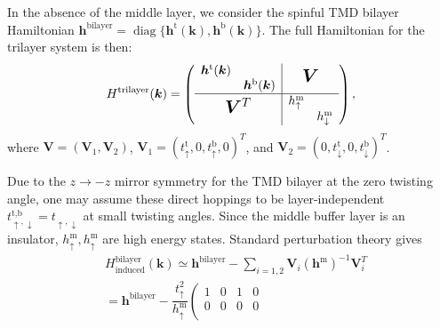\begin{subappendices}
	In the absence of the middle layer, we consider the spinful TMD bilayer Hamiltonian $\bm{h}^\text{bilayer}=\mathop{\mathrm{diag}}\{\bm{h}^\text{t}(\bm{k}), \bm{h}^\text{b}(\bm{k})\}$. The full Hamiltonian for the trilayer system is then:
	\begin{equation}\label{trilayer Hamiltonian}
		H^{\text{trilayer}}(\bm{k})=\left(\begin{array}{c|c}
				\begin{matrix}
					\bm{h}^\text{t}(\bm{k}) &                         \\
					                        & \bm{h}^\text{b}(\bm{k})
				\end{matrix} & \text{\Large $\bm{V}$}                                                  \\
				\hline
				\text{\Large $\bm{V}^T$}                             & \begin{matrix}
					                                                       h^\text{m}_\uparrow &                       \\
					                                                                           & h^\text{m}_\downarrow
				                                                       \end{matrix}
			\end{array}\right),
	\end{equation}
	where $\bm{V}=(\bm{V}_1,\bm{V}_2)$, $\bm{V}_1=(t^\text{t}_\uparrow,0,t^\text{b}_\uparrow,0)^T$, and $\bm{V}_2=(0,t^\text{t}_\downarrow,0,t^\text{b}_\downarrow)^T$.\par
	Due to the $z\rightarrow -z$ mirror symmetry for the TMD bilayer at the zero twisting angle, one may assume these direct hoppings to be layer-independent $t^{\text{t,b}}_{\uparrow,\downarrow}=t_{\uparrow,\downarrow}$ at small twisting angles. Since the middle buffer layer is an insulator, 	$h^\text{m}_\uparrow,	h^\text{m}_\uparrow$ are high energy states. Standard perturbation theory gives
	\begin{align}
		 & H^{\text{bilayer}}_\text{induced}(\bm{k})\simeq \bm{h}^{\text{bilayer}}-\sum_{i=1,2} \bm{V}_i(\bm{h}^\text{m})^{-1}\bm{V}_i^T\nonumber                                    \\
		 & =\bm{h}^{\text{bilayer}}-\dfrac{t_\uparrow^2}{h^\text{m}_\uparrow}\left(\begin{array}{cccc}
				                                                                           1 & 0 & 1 & 0 \\
				                                                                           0 & 0 & 0 & 0 \\

\end{array}
\end{align}
\end{subappendices}
